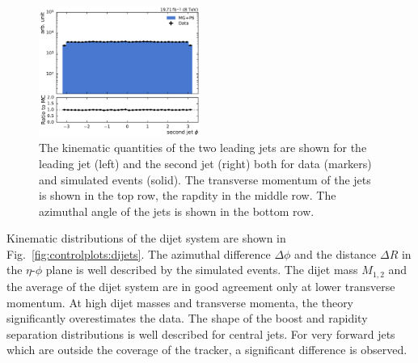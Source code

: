 \begin{figure}[htbp]
    \includegraphics[width=0.47\textwidth]{figures/measurement/jet_quantities_jet2phi.pdf}
    \caption[Kinematic quantities of the jets]{The 
        kinematic quantities of the two leading jets are shown for the leading
        jet (left) and the second jet (right) both for data (markers) and
        simulated events (solid). The transverse momentum of the
        jets is shown in the top row, the rapdity in the middle row. The
        azimuthal angle of the jets is shown in the bottom row.}
    \label{fig:controlplots:kinematic}
\end{figure}

Kinematic distributions of the dijet system are shown in
Fig.~\ref{fig:controlplots:dijets}. The azimuthal difference $\Delta\phi$ and
the distance $\Delta R$ in the $\eta$-$\phi$ plane is well described by the
simulated events. The dijet mass $M_{1,2}$ and the average \pt of the dijet
system are in good agreement only at lower transverse momentum. At high dijet
masses and transverse momenta, the theory significantly overestimates the data.
The shape of the boost and rapidity separation distributions is well described
for central jets. For very forward jets which are outside the coverage of the
tracker, a significant difference is observed.

